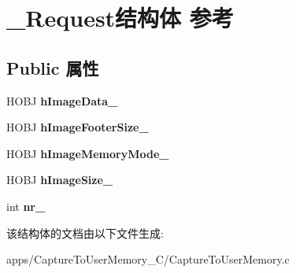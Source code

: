 \hypertarget{struct___request}{\section{\+\_\+\+Request结构体 参考}
\label{struct___request}
}
\subsection*{Public 属性}
\begin{DoxyCompactItemize}
\item 
\hypertarget{struct___request_a7104e714f7831cdf9e6f5f190a17571a}{H\+O\+B\+J {\bfseries h\+Image\+Data\+\_\+}}\label{struct___request_a7104e714f7831cdf9e6f5f190a17571a}

\item 
\hypertarget{struct___request_ae1333a09a3a13d6537a0416a94fde51d}{H\+O\+B\+J {\bfseries h\+Image\+Footer\+Size\+\_\+}}\label{struct___request_ae1333a09a3a13d6537a0416a94fde51d}

\item 
\hypertarget{struct___request_a54e6d3cd9b3d2edfc50daa63717013ac}{H\+O\+B\+J {\bfseries h\+Image\+Memory\+Mode\+\_\+}}\label{struct___request_a54e6d3cd9b3d2edfc50daa63717013ac}

\item 
\hypertarget{struct___request_af3f70e5672ec72a62bdeca7119cfa3ae}{H\+O\+B\+J {\bfseries h\+Image\+Size\+\_\+}}\label{struct___request_af3f70e5672ec72a62bdeca7119cfa3ae}

\item 
\hypertarget{struct___request_a86a145171690a83ece8e60289208fed9}{int {\bfseries nr\+\_\+}}\label{struct___request_a86a145171690a83ece8e60289208fed9}

\end{DoxyCompactItemize}


该结构体的文档由以下文件生成\+:\begin{DoxyCompactItemize}
\item 
apps/\+Capture\+To\+User\+Memory\+\_\+\+C/Capture\+To\+User\+Memory.\+c\end{DoxyCompactItemize}
